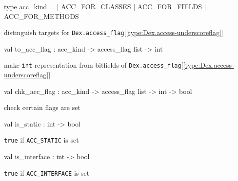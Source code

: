 \documentclass[11pt]{article}
\begin{document}
\label{type:Dex.acc-underscorekind}\begin{ocamldoccode}
type acc_kind =
  | ACC_FOR_CLASSES
  | ACC_FOR_FIELDS
  | ACC_FOR_METHODS
\end{ocamldoccode}
\begin{ocamldocdescription}
distinguish targets for {\tt{Dex.access\_flag}}[\ref{type:Dex.access-underscoreflag}]


\end{ocamldocdescription}




\label{val:Dex.to-underscoreacc-underscoreflag}\begin{ocamldoccode}
val to_acc_flag : acc_kind -> access_flag list -> int
\end{ocamldoccode}
\begin{ocamldocdescription}
make {\tt{int}} representation from bitfields of {\tt{Dex.access\_flag}}[\ref{type:Dex.access-underscoreflag}]


\end{ocamldocdescription}




\label{val:Dex.chk-underscoreacc-underscoreflag}\begin{ocamldoccode}
val chk_acc_flag : acc_kind -> access_flag list -> int -> bool
\end{ocamldoccode}
\begin{ocamldocdescription}
check certain flags are set


\end{ocamldocdescription}




\label{val:Dex.is-underscorestatic}\begin{ocamldoccode}
val is_static : int -> bool
\end{ocamldoccode}
\begin{ocamldocdescription}
{\tt{true}} if {\tt{ACC\_STATIC}} is set


\end{ocamldocdescription}




\label{val:Dex.is-underscoreinterface}\begin{ocamldoccode}
val is_interface : int -> bool
\end{ocamldoccode}
\begin{ocamldocdescription}
{\tt{true}} if {\tt{ACC\_INTERFACE}} is set


\end{ocamldocdescription}
\end{document}
